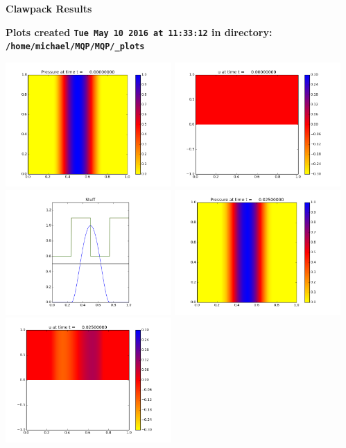 \documentclass[11pt]{article}
\begin{document}
        \begin{center}{\Large\bf Clawpack Results}\vskip 5pt
        
        \bf Plots created {\tt Tue May 10 2016 at 11:33:12} in directory: \vskip 5pt
        \verb+/home/michael/MQP/MQP/_plots+
        \end{center}
        \vskip 5pt
        \includegraphics[width=0.475\textwidth]{frame0000fig0.png}
\includegraphics[width=0.475\textwidth]{frame0000fig1.png}
\vskip 10pt 
\includegraphics[width=0.475\textwidth]{frame0000fig3.png}
\vskip 10pt 
\includegraphics[width=0.475\textwidth]{frame0001fig0.png}
\includegraphics[width=0.475\textwidth]{frame0001fig1.png}
\end{document}
